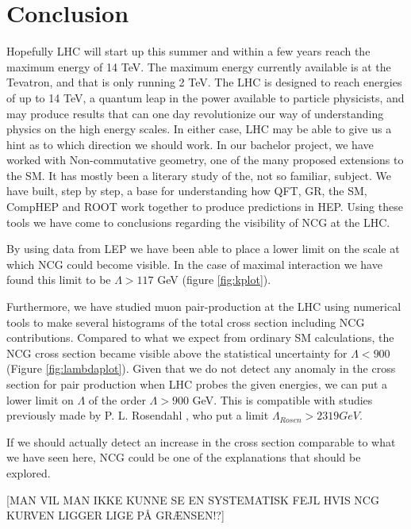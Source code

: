 \section{Conclusion}
Hopefully LHC will start up this summer and within a few years reach the maximum energy of 14 TeV. The maximum energy currently available is at the Tevatron, and that is only running 2 TeV. The LHC is designed to reach energies of up to 14 TeV, a quantum leap in the power available to particle physicists, and may produce results that can one day revolutionize our way of understanding physics on the high energy scales. In either case, LHC may be able to give us a hint as to which direction we should work. In our bachelor project, we have worked with Non-commutative geometry, one of the many proposed extensions to the SM. It has mostly been a literary study of the, not so familiar, subject. We have built, step by step, a base for understanding how QFT, GR, the SM, CompHEP and ROOT work together to produce predictions in HEP. Using these tools we have come to conclusions regarding the visibility of NCG at the LHC.

By using data from LEP we have been able to place a lower limit on the scale at which NCG could become visible. In the case of maximal interaction we have found this limit to be $\Lambda > 117$ GeV (figure \ref{fig:kplot}).

Furthermore, we have studied muon pair-production at the LHC using numerical tools to make several histograms of the total cross section including NCG contributions. Compared to what we expect from ordinary SM calculations, the NCG cross section became visible above the statistical uncertainty for $\Lambda < 900$ (Figure \ref{fig:lambdaplot}). Given that we do not detect any anomaly in the cross section for pair production when LHC probes the given energies, we can put a lower limit on $\Lambda$ of the order $\Lambda > 900$ GeV. This is compatible with studies previously made by P. L. Rosendahl \cite{rosendahl2008}, who put a limit $\Lambda_{Rosen} > 2319 GeV$.

If we should actually detect an increase in the cross section comparable to what we have seen here, NCG could be one of the explanations that should be explored.

[MAN VIL MAN IKKE KUNNE SE EN SYSTEMATISK FEJL HVIS NCG KURVEN LIGGER LIGE PÅ GRÆNSEN!?]


